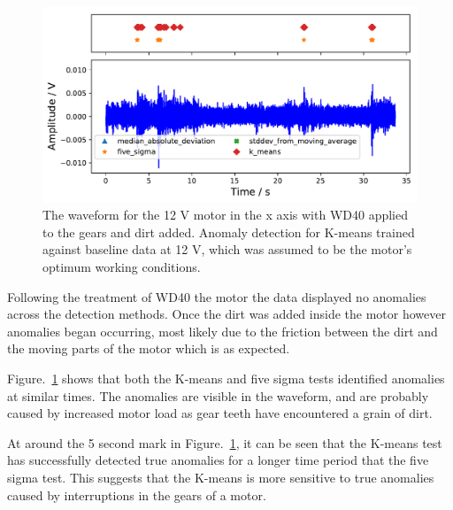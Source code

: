 \begin{figure}[t]
    \includegraphics[width=1.0\textwidth]{fig/WD40_dry_dirt_12V_motornorm12V.pdf}
    \caption[Anomaly Tests 12 V Motor with Dirt]{The waveform for the 12 V motor in the x axis with WD40 applied to the gears and dirt added. Anomaly detection for K-means trained against baseline data at 12 V, which was assumed to be the motor's optimum working conditions.}
    \label{fig:12V_dirt}
\end{figure}

Following the treatment of WD40 the motor the data displayed no anomalies across the detection methods. Once the dirt was added inside the motor however anomalies began occurring, most likely due to the friction between the dirt and the moving parts of the motor which is as expected.

Figure.~\ref{fig:12V_dirt} shows that both the K-means and five sigma tests identified anomalies at similar times. The anomalies are visible in the waveform, and are probably caused by increased motor load as gear teeth have encountered a grain of dirt. 

At around the 5 second mark in Figure.~\ref{fig:12V_dirt}, it can be seen that the K-means test has successfully detected true anomalies for a longer time period that the five sigma test. This suggests that the K-means is more sensitive to true anomalies caused by interruptions in the gears of a motor.


